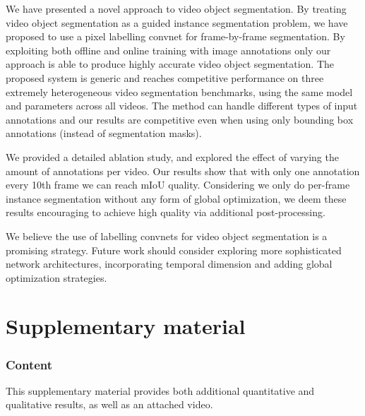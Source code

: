 \documentclass[10pt,twocolumn,letterpaper]{article}
\begin{document}
We have presented a novel approach to video object segmentation. By treating video object segmentation as a guided instance segmentation problem,
we have proposed to use a pixel labelling convnet for frame-by-frame segmentation.
By exploiting both offline and online training with image annotations only our approach is able to produce highly accurate video object segmentation.
The proposed system is generic and reaches competitive performance on three extremely heterogeneous video segmentation benchmarks, using the same model and parameters across all videos.
The method can handle different types of input annotations and our results are competitive even when using only bounding box annotations (instead of segmentation masks).

We provided a detailed ablation study, and explored the effect of varying the amount of annotations per video.
Our results show that with only one annotation every 10th frame we can reach  mIoU quality.
Considering we only do per-frame instance segmentation without any form of global optimization,
we deem these results encouraging to achieve high quality via additional post-processing.

We believe the use of labelling convnets for video object segmentation is a promising strategy. Future work should consider exploring more sophisticated network architectures, incorporating temporal dimension
and adding global optimization strategies.
 
\FloatBarrier
{\small


}

\renewcommand{\thetable}{S\arabic{table}}
\renewcommand{\thefigure}{S\arabic{figure}}

\newpage
\clearpage
\appendix
\part*{Supplementary material}
\section{Content}
\label{sec:content}

This supplementary material provides both additional
quantitative and qualitative results, as well as an attached
video.
\end{document}
